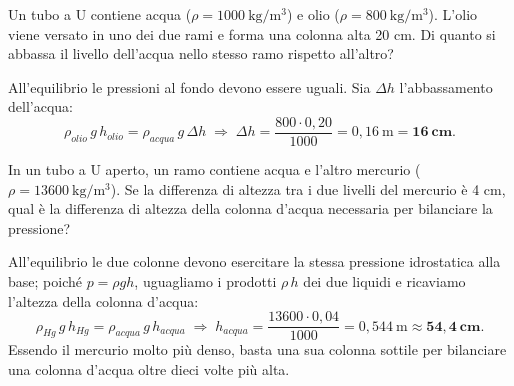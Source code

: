 \begin{question}[ID=1.1, subtitle={Tubo a U con acqua e olio}, tags={fluidi, pressione, tubo a U}, difficulty=facile]
Un tubo a U contiene acqua ($\rho = 1000\ \mathrm{kg/m^3}$) e olio ($\rho = 800\ \mathrm{kg/m^3}$). L'olio viene versato in uno dei due rami e forma una colonna alta 20 cm. Di quanto si abbassa il livello dell'acqua nello stesso ramo rispetto all'altro?
\begin{solution}
All'equilibrio le pressioni al fondo devono essere uguali. Sia $\Delta h$ l'abbassamento dell'acqua:
\[
\rho_{olio}\,g\,h_{olio} = \rho_{acqua}\,g\,\Delta h
\;\Rightarrow\;
\Delta h = \frac{800 \cdot 0{,}20}{1000} = 0{,}16\ \mathrm{m} = \mathbf{16\ cm}.
\]
\end{solution}
\end{question}


\begin{question}[ID=1.2, subtitle={Tubo a U con acqua e mercurio}, tags={fluidi, pressione, tubo a U}, difficulty=facile]
In un tubo a U aperto, un ramo contiene acqua e l'altro mercurio ($\rho = 13600\ \mathrm{kg/m^3}$). Se la differenza di altezza tra i due livelli del mercurio è 4 cm, qual è la differenza di altezza della colonna d'acqua necessaria per bilanciare la pressione?
\begin{solution}
All'equilibrio le due colonne devono esercitare la stessa pressione idrostatica alla base; poiché $p = \rho g h$, uguagliamo i prodotti $\rho\,h$ dei due liquidi e ricaviamo l'altezza della colonna d'acqua:
\[
\rho_{Hg}\,g\,h_{Hg} = \rho_{acqua}\,g\,h_{acqua}
\;\Rightarrow\;
h_{acqua} = \frac{13600 \cdot 0{,}04}{1000} = 0{,}544\ \mathrm{m} \approx \mathbf{54{,}4\ cm}.
\]
Essendo il mercurio molto più denso, basta una sua colonna sottile per bilanciare una colonna d'acqua oltre dieci volte più alta.
\end{solution}
\end{question}


